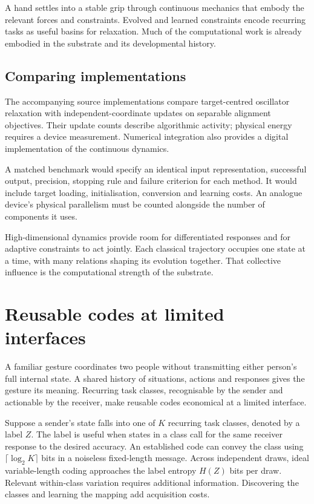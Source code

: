 \documentclass[11pt,a4paper]{article}
\begin{document}
A hand settles into a stable grip through continuous mechanics that embody the relevant forces and constraints. Evolved and learned constraints encode recurring tasks as useful basins for relaxation. Much of the computational work is already embodied in the substrate and its developmental history.

\subsection{Comparing implementations}

The accompanying source implementations compare target-centred oscillator relaxation with independent-coordinate updates on separable alignment objectives. Their update counts describe algorithmic activity; physical energy requires a device measurement. Numerical integration also provides a digital implementation of the continuous dynamics.

A matched benchmark would specify an identical input representation, successful output, precision, stopping rule and failure criterion for each method. It would include target loading, initialisation, conversion and learning costs. An analogue device's physical parallelism must be counted alongside the number of components it uses.

High-dimensional dynamics provide room for differentiated responses and for adaptive constraints to act jointly. Each classical trajectory occupies one state at a time, with many relations shaping its evolution together. That collective influence is the computational strength of the substrate.

\section{Reusable codes at limited interfaces}
\label{sec:codes}

A familiar gesture coordinates two people without transmitting either person's full internal state. A shared history of situations, actions and responses gives the gesture its meaning. Recurring task classes, recognisable by the sender and actionable by the receiver, make reusable codes economical at a limited interface.

Suppose a sender's state falls into one of \(K\) recurring task classes, denoted by a label \(Z\). The label is useful when states in a class call for the same receiver response to the desired accuracy. An established code can convey the class using \(\lceil\log_2 K\rceil\) bits in a noiseless fixed-length message. Across independent draws, ideal variable-length coding approaches the label entropy \(H(Z)\) bits per draw. Relevant within-class variation requires additional information. Discovering the classes and learning the mapping add acquisition costs.
\end{document}
